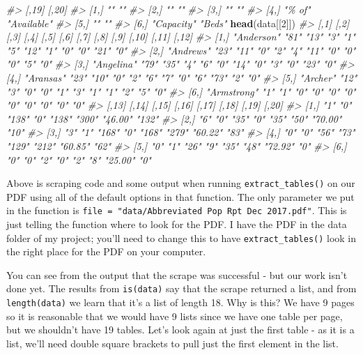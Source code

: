 \documentclass[
  12pt,
]{book}
\newenvironment{Shaded}{\begin{snugshade}}{\end{snugshade}}
\newcommand{\CommentTok}[1]{\textcolor[rgb]{0.37,0.37,0.37}{\textit{#1}}}
\newcommand{\DecValTok}[1]{\textcolor[rgb]{0.06,0.06,0.06}{#1}}
\newcommand{\KeywordTok}[1]{\textcolor[rgb]{0.27,0.27,0.27}{\textbf{#1}}}
\newcommand{\NormalTok}[1]{#1}
\begin{document}
\begin{Shaded}
\begin{Highlighting}[]
\CommentTok{\#\textgreater{}      [,19]      [,20]      }
\CommentTok{\#\textgreater{} [1,] ""         ""         }
\CommentTok{\#\textgreater{} [2,] ""         ""         }
\CommentTok{\#\textgreater{} [3,] ""         ""         }
\CommentTok{\#\textgreater{} [4,] "\% of"     "Available"}
\CommentTok{\#\textgreater{} [5,] ""         ""         }
\CommentTok{\#\textgreater{} [6,] "Capacity" "Beds"}
\KeywordTok{head}\NormalTok{(data[[}\DecValTok{2}\NormalTok{]])}
\CommentTok{\#\textgreater{}      [,1]        [,2] [,3] [,4] [,5] [,6] [,7] [,8] [,9] [,10] [,11] [,12]}
\CommentTok{\#\textgreater{} [1,] "Anderson"  "81" "13" "3"  "1"  "5"  "12" "1"  "0"  "0"   "21"  "0"  }
\CommentTok{\#\textgreater{} [2,] "Andrews"   "23" "11" "0"  "2"  "4"  "11" "0"  "0"  "0"   "5"   "0"  }
\CommentTok{\#\textgreater{} [3,] "Angelina"  "79" "35" "4"  "6"  "0"  "14" "0"  "3"  "0"   "23"  "0"  }
\CommentTok{\#\textgreater{} [4,] "Aransas"   "23" "10" "0"  "2"  "6"  "7"  "0"  "6"  "73"  "2"   "0"  }
\CommentTok{\#\textgreater{} [5,] "Archer"    "12" "3"  "0"  "0"  "1"  "3"  "1"  "1"  "2"   "5"   "0"  }
\CommentTok{\#\textgreater{} [6,] "Armstrong" "1"  "1"  "0"  "0"  "0"  "0"  "0"  "0"  "0"   "0"   "0"  }
\CommentTok{\#\textgreater{}      [,13] [,14] [,15] [,16] [,17] [,18] [,19]   [,20]}
\CommentTok{\#\textgreater{} [1,] "1"   "0"   "138" "0"   "138" "300" "46.00" "132"}
\CommentTok{\#\textgreater{} [2,] "6"   "0"   "35"  "0"   "35"  "50"  "70.00" "10" }
\CommentTok{\#\textgreater{} [3,] "3"   "1"   "168" "0"   "168" "279" "60.22" "83" }
\CommentTok{\#\textgreater{} [4,] "0"   "0"   "56"  "73"  "129" "212" "60.85" "62" }
\CommentTok{\#\textgreater{} [5,] "0"   "1"   "26"  "9"   "35"  "48"  "72.92" "0"  }
\CommentTok{\#\textgreater{} [6,] "0"   "0"   "2"   "0"   "2"   "8"   "25.00" "0"}
\end{Highlighting}
\end{Shaded}

Above is scraping code and some output when running \texttt{extract\_tables()} on our PDF using all of the default options in that function. The only parameter we put in the function is \texttt{file\ =\ "data/Abbreviated\ Pop\ Rpt\ Dec\ 2017.pdf"}. This is just telling the function where to look for the PDF. I have the PDF in the data folder of my project; you'll need to change this to have \texttt{extract\_tables()} look in the right place for the PDF on your computer.

You can see from the output that the scrape was successful - but our work isn't done yet. The results from \texttt{is(data)} say that the scrape returned a list, and from \texttt{length(data)} we learn that it's a list of length 18. Why is this? We have 9 pages so it is reasonable that we would have 9 lists since we have one table per page, but we shouldn't have 19 tables. Let's look again at just the first table - as it is a list, we'll need double square brackets to pull just the first element in the list.
\end{document}
